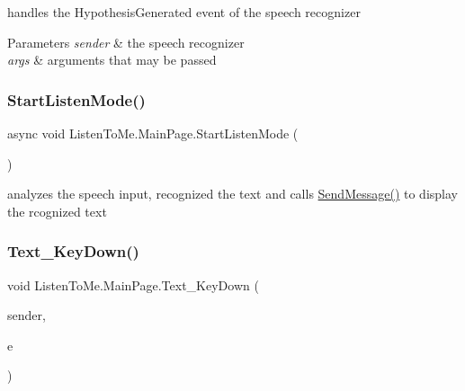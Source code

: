 handles the Hypothesis\+Generated event of the speech recognizer 


\begin{DoxyParams}{Parameters}
{\em sender} & the speech recognizer\\
\hline
{\em args} & arguments that may be passed\\
\hline
\end{DoxyParams}
\mbox{\label{class_listen_to_me_1_1_main_page_ab9fba04f0fc94773c2838f6af87ec14b}} 
\subsubsection{\texorpdfstring{Start\+Listen\+Mode()}{StartListenMode()}}
{\footnotesize\ttfamily async void Listen\+To\+Me.\+Main\+Page.\+Start\+Listen\+Mode (\begin{DoxyParamCaption}{ }\end{DoxyParamCaption})\hspace{0.3cm}{\ttfamily [private]}}



analyzes the speech input, recognized the text and calls \mbox{\hyperlink{class_listen_to_me_1_1_main_page_a09c2518852d4261ff6a2118c8e01de9f}{Send\+Message()}} to display the rcognized text 

\mbox{\label{class_listen_to_me_1_1_main_page_a1a90b99d968c5e20d291452daff8a0c3}} 
\subsubsection{\texorpdfstring{Text\+\_\+\+Key\+Down()}{Text\_KeyDown()}}
{\footnotesize\ttfamily void Listen\+To\+Me.\+Main\+Page.\+Text\+\_\+\+Key\+Down (\begin{DoxyParamCaption}\item[{object}]{sender,  }\item[{Key\+Routed\+Event\+Args}]{e }\end{DoxyParamCaption})\hspace{0.3cm}{\ttfamily [private]}}



